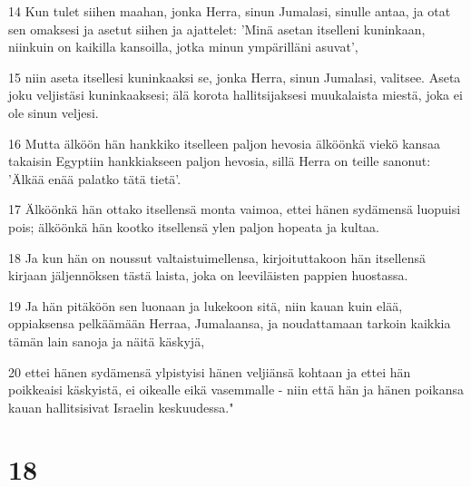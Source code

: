 \par 14 Kun tulet siihen maahan, jonka Herra, sinun Jumalasi, sinulle antaa, ja otat sen omaksesi ja asetut siihen ja ajattelet: 'Minä asetan itselleni kuninkaan, niinkuin on kaikilla kansoilla, jotka minun ympärilläni asuvat',
\par 15 niin aseta itsellesi kuninkaaksi se, jonka Herra, sinun Jumalasi, valitsee. Aseta joku veljistäsi kuninkaaksesi; älä korota hallitsijaksesi muukalaista miestä, joka ei ole sinun veljesi.
\par 16 Mutta älköön hän hankkiko itselleen paljon hevosia älköönkä viekö kansaa takaisin Egyptiin hankkiakseen paljon hevosia, sillä Herra on teille sanonut: 'Älkää enää palatko tätä tietä'.
\par 17 Älköönkä hän ottako itsellensä monta vaimoa, ettei hänen sydämensä luopuisi pois; älköönkä hän kootko itsellensä ylen paljon hopeata ja kultaa.
\par 18 Ja kun hän on noussut valtaistuimellensa, kirjoituttakoon hän itsellensä kirjaan jäljennöksen tästä laista, joka on leeviläisten pappien huostassa.
\par 19 Ja hän pitäköön sen luonaan ja lukekoon sitä, niin kauan kuin elää, oppiaksensa pelkäämään Herraa, Jumalaansa, ja noudattamaan tarkoin kaikkia tämän lain sanoja ja näitä käskyjä,
\par 20 ettei hänen sydämensä ylpistyisi hänen veljiänsä kohtaan ja ettei hän poikkeaisi käskyistä, ei oikealle eikä vasemmalle - niin että hän ja hänen poikansa kauan hallitsisivat Israelin keskuudessa."

\chapter{18}

